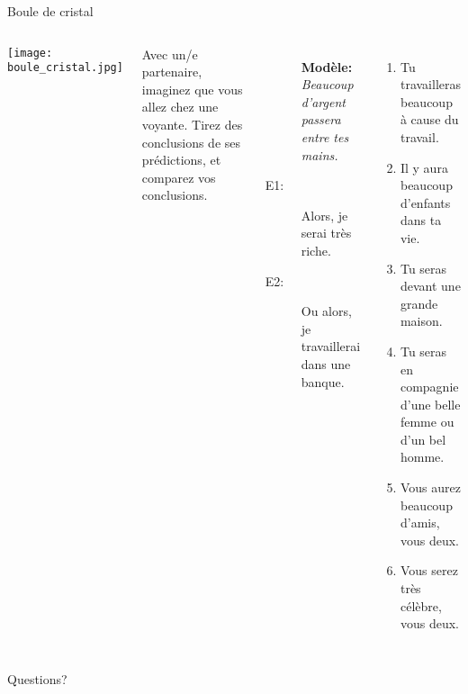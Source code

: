 \documentclass{beamer}
\begin{document}
  \begin{frame}{Boule de cristal}
    \begin{columns}
        \begin{center}
          \texttt{[image: boule\_cristal.jpg]}
        \end{center}
        \scriptsize
        Avec un/e partenaire, imaginez que vous allez chez une voyante.
        Tirez  des conclusions de ses prédictions, et comparez vos conclusions.
        \begin{description}
          \item[] \textbf{Modèle:} \textit{Beaucoup d'argent passera entre tes mains.}
          \item[E1:] Alors, je serai très riche.
          \item[E2:] Ou alors, je travaillerai dans une banque.
        \end{description}
        \begin{enumerate}
          \item Tu travailleras beaucoup à cause du travail.
          \item Il y aura beaucoup d'enfants dans ta vie.
          \item Tu seras devant une grande maison.
          \item Tu seras en compagnie d'une belle femme ou d'un bel homme.
          \item Vous aurez beaucoup d'amis, vous deux.
          \item Vous serez très célèbre, vous deux.
        \end{enumerate}
    \end{columns}
  \end{frame}

  \begin{frame}{}
    \begin{center}
      \Large Questions?
    \end{center}
  \end{frame}
\end{document}
